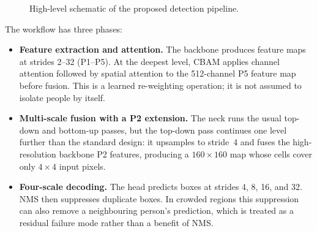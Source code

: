 \documentclass[12pt,a4paper,oneside]{report}
\begin{document}
\begin{figure}[tbp]

  \caption{High-level schematic of the proposed detection pipeline.}
  \label{fig:framework}
\end{figure}

The workflow has three phases:
\begin{itemize}
  \item \textbf{Feature extraction and attention.} The backbone produces feature
  maps at strides 2--32 (P1--P5). At the deepest level, CBAM applies channel
  attention followed by spatial attention to the 512-channel P5 feature map
  before fusion. This is a learned re-weighting operation; it is not assumed to
  isolate people by itself.
  \item \textbf{Multi-scale fusion with a P2 extension.} The neck runs the usual
  top-down and bottom-up passes, but the top-down pass continues one level
  further than the standard design: it upsamples to stride~4 and fuses the
  high-resolution backbone P2 features, producing a $160 \times 160$ map whose
  cells cover only $4 \times 4$ input pixels.
  \item \textbf{Four-scale decoding.} The head predicts boxes at strides 4, 8,
  16, and 32. NMS then suppresses duplicate boxes. In crowded regions this
  suppression can also remove a neighbouring person's prediction, which is
  treated as a residual failure mode rather than a benefit of NMS.
\end{itemize}
\end{document}
